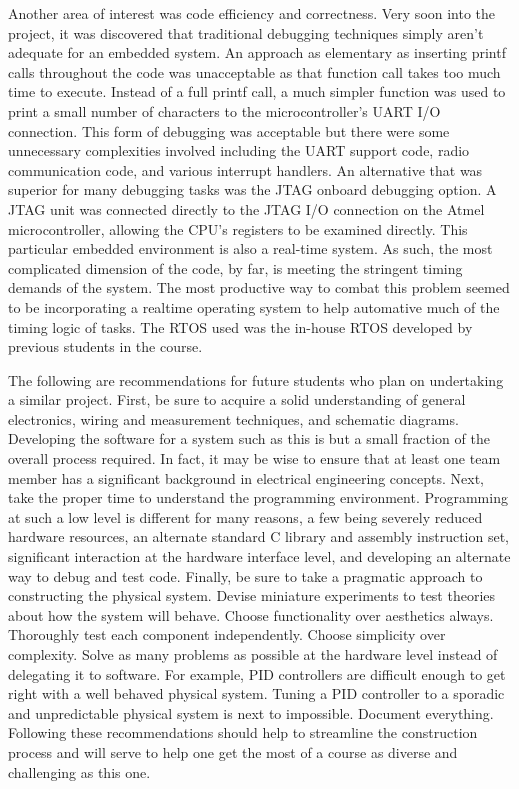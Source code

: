 Another area of interest was code efficiency and correctness.  Very soon into the project, it was discovered that traditional debugging techniques simply aren't adequate for an embedded system.  An approach as elementary as inserting printf calls throughout the code was unacceptable as that function call takes too much time to execute.  Instead of a full printf call, a much simpler function was used to print a small number of characters to the microcontroller's UART I/O connection.  This form of debugging was acceptable but there were some unnecessary complexities involved including the UART support code, radio communication code, and various interrupt handlers.  An alternative that was superior for many debugging tasks was the JTAG onboard debugging option.  A JTAG unit was connected directly to the JTAG I/O connection on the Atmel microcontroller, allowing the CPU's registers to be examined directly.  This particular embedded environment is also a real-time system.  As such, the most complicated dimension of the code, by far, is meeting the stringent timing demands of the system.  The most productive way to combat this problem seemed to be incorporating a realtime operating system to help automative much of the timing logic of tasks.  The RTOS used was the in-house RTOS developed by previous students in the course.  

The following are recommendations for future students who plan on undertaking a similar project.  First, be sure to acquire a solid understanding of general electronics, wiring and measurement techniques, and schematic diagrams.  Developing the software for a system such as this is but a small fraction of the overall process required.  In fact, it may be wise to ensure that at least one team member has a significant background in electrical engineering concepts. Next, take the proper time to understand the programming environment.  Programming at such a low level is different for many reasons, a few being severely reduced hardware resources, an alternate standard C library and assembly instruction set, significant interaction at the hardware interface level, and developing an alternate way to debug and test code.  Finally, be sure to take a pragmatic approach to constructing the physical system.  Devise miniature experiments to test theories about how the system will behave.  Choose functionality over aesthetics always. Thoroughly test each component independently. Choose simplicity over complexity.  Solve as many problems as possible at the hardware level instead of delegating it to software.  For example, PID controllers are difficult enough to get right with a well behaved physical system.  Tuning a PID controller to a sporadic and unpredictable physical system is next to impossible. Document everything.  Following these recommendations should help to streamline the construction process and will serve to help one get the most of a course as diverse and challenging as this one. 